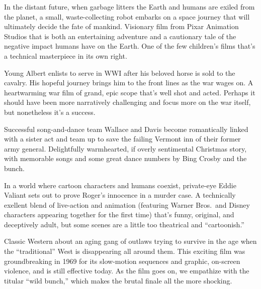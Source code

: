    In the distant future, when garbage litters the Earth and humans are exiled from the planet, a small, waste-collecting robot embarks on a space journey that will ultimately decide the fate of mankind. Visionary film from Pixar Animation Studios that is both an entertaining adventure and a cautionary tale of the negative impact humans have on the Earth. One of the few children's films that's a technical masterpiece in its own right. \author{DW} 

   Young Albert enlists to serve in WWI after his beloved horse is sold to the cavalry. His hopeful journey brings him to the front lines as the war wages on. A heartwarming war film of grand, epic scope that's well shot and acted. Perhaps it should have been more narratively challenging and focus more on the war itself, but nonetheless it's a success. \author{DW} 

   Successful song-and-dance team Wallace and Davis become romantically linked with a sister act and team up to save the failing Vermont inn of their former army general. Delightfully warmhearted, if overly sentimental Christmas story, with memorable songs and some great dance numbers by Bing Crosby and the bunch. \author{DW}

   In a world where cartoon characters and humans coexist, private-eye Eddie Valiant sets out to prove Roger's innocence in a murder case. A technically exellent blend of live-action and animation (featuring Warner Bros.\ and Disney characters appearing together for the first time) that's funny, original, and deceptively adult, but some scenes are a little too theatrical and ``cartoonish.'' \author{DW} 

   Classic Western about an aging gang of outlaws trying to survive in the age when the ``traditional'' West is disappearing all around them. This exciting film was groundbreaking in 1969 for its slow-motion sequences and graphic, on-screen violence, and is still effective today. As the film goes on, we empathize with the titular ``wild bunch,'' which makes the brutal finale all the more shocking. \author{DW} 

